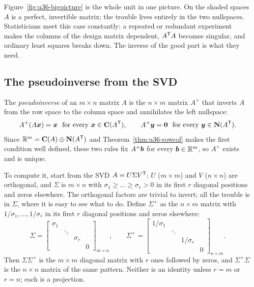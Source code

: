 Figure~\ref{fig:u36-bigpicture} is the whole unit in one picture. On the shaded spaces $A$ is a perfect, invertible matrix; the trouble lives entirely in the two nullspaces. Statisticians meet this case constantly: a repeated or redundant experiment makes the columns of the design matrix dependent, $A^{\mathsf{T}} A$ becomes singular, and ordinary least squares breaks down. The inverse of the good part is what they need.

\subsection{The pseudoinverse from the SVD}

\begin{definition}[Pseudoinverse]\label{def:u36-pinv}
The \emph{pseudoinverse} of an $m\times n$ matrix $A$ is the $n\times m$ matrix $A^{+}$ that inverts $A$ from the row space to the column space and annihilates the left nullspace:
\[
A^{+}(A\boldsymbol{x})=\boldsymbol{x}\ \text{ for every }\boldsymbol{x}\in\mathbf{C}(A^{\mathsf{T}}),\qquad A^{+}\boldsymbol{y}=\boldsymbol{0}\ \text{ for every }\boldsymbol{y}\in\mathbf{N}(A^{\mathsf{T}}).
\]
Since $\mathbb{R}^m=\mathbf{C}(A)\oplus\mathbf{N}(A^{\mathsf{T}})$ and Theorem~\ref{thm:u36-rowcol} makes the first condition well defined, these two rules fix $A^{+}\boldsymbol{b}$ for every $\boldsymbol{b}\in\mathbb{R}^m$, so $A^{+}$ exists and is unique.
\end{definition}

To compute it, start from the SVD $A=U\Sigma V^{\mathsf{T}}$: $U$ ($m\times m$) and $V$ ($n\times n$) are orthogonal, and $\Sigma$ is $m\times n$ with $\sigma_1\ge\dots\ge\sigma_r>0$ in its first $r$ diagonal positions and zeros elsewhere. The orthogonal factors are trivial to invert; all the trouble is in $\Sigma$, where it is easy to see what to do. Define $\Sigma^{+}$ as the $n\times m$ matrix with $1/\sigma_1,\dots,1/\sigma_r$ in its first $r$ diagonal positions and zeros elsewhere:
\[
\Sigma=\begin{bmatrix}\sigma_1&&&\\&\ddots&&\\&&\sigma_r&\\&&&0\end{bmatrix}_{m\times n},\qquad
\Sigma^{+}=\begin{bmatrix}1/\sigma_1&&&\\&\ddots&&\\&&1/\sigma_r&\\&&&0\end{bmatrix}_{n\times m}.
\]
Then $\Sigma\Sigma^{+}$ is the $m\times m$ diagonal matrix with $r$ ones followed by zeros, and $\Sigma^{+}\Sigma$ is the $n\times n$ matrix of the same pattern. Neither is an identity unless $r=m$ or $r=n$; each is a projection.


